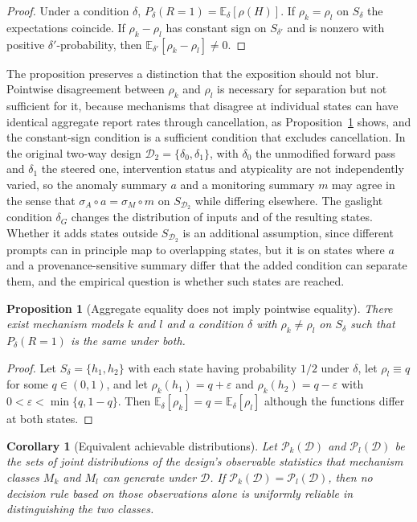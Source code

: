 \documentclass[11pt]{article}
\newtheorem{proposition}{Proposition}
\newtheorem{corollary}{Corollary}
\theoremstyle{definition}
\theoremstyle{remark}
\begin{document}
\begin{proof}
Under a condition $\delta$, $P_\delta(R=1)=\mathbb{E}_\delta[\rho(H)]$. If $\rho_k=\rho_l$ on $S_\delta$ the expectations coincide. If $\rho_k-\rho_l$ has constant sign on $S_{\delta'}$ and is nonzero with positive $\delta'$-probability, then $\mathbb{E}_{\delta'}[\rho_k-\rho_l]\neq 0$.
\end{proof}

The proposition preserves a distinction that the exposition should not blur. Pointwise disagreement between $\rho_k$ and $\rho_l$ is necessary for separation but not sufficient for it, because mechanisms that disagree at individual states can have identical aggregate report rates through cancellation, as Proposition~\ref{prop:cancel} shows, and the constant-sign condition is a sufficient condition that excludes cancellation. In the original two-way design $\mathcal{D}_2=\{\delta_0,\delta_1\}$, with $\delta_0$ the unmodified forward pass and $\delta_1$ the steered one, intervention status and atypicality are not independently varied, so the anomaly summary $a$ and a monitoring summary $m$ may agree in the sense that $\sigma_A\circ a=\sigma_M\circ m$ on $S_{\mathcal{D}_2}$ while differing elsewhere. The gaslight condition $\delta_G$ changes the distribution of inputs and of the resulting states. Whether it adds states outside $S_{\mathcal{D}_2}$ is an additional assumption, since different prompts can in principle map to overlapping states, but it is on states where $a$ and a provenance-sensitive summary differ that the added condition can separate them, and the empirical question is whether such states are reached.

\begin{proposition}[Aggregate equality does not imply pointwise equality]\label{prop:cancel}
There exist mechanism models $k$ and $l$ and a condition $\delta$ with $\rho_k\neq\rho_l$ on $S_\delta$ such that $P_\delta(R=1)$ is the same under both.
\end{proposition}

\begin{proof}
Let $S_\delta=\{h_1,h_2\}$ with each state having probability $1/2$ under $\delta$, let $\rho_l\equiv q$ for some $q\in(0,1)$, and let $\rho_k(h_1)=q+\varepsilon$ and $\rho_k(h_2)=q-\varepsilon$ with $0<\varepsilon<\min\{q,1-q\}$. Then $\mathbb{E}_\delta[\rho_k]=q=\mathbb{E}_\delta[\rho_l]$ although the functions differ at both states.
\end{proof}

\begin{corollary}[Equivalent achievable distributions]\label{cor:noupdate}
Let $\mathcal{P}_k(\mathcal{D})$ and $\mathcal{P}_l(\mathcal{D})$ be the sets of joint distributions of the design's observable statistics that mechanism classes $M_k$ and $M_l$ can generate under $\mathcal{D}$. If $\mathcal{P}_k(\mathcal{D})=\mathcal{P}_l(\mathcal{D})$, then no decision rule based on those observations alone is uniformly reliable in distinguishing the two classes.
\end{corollary}
\end{document}
